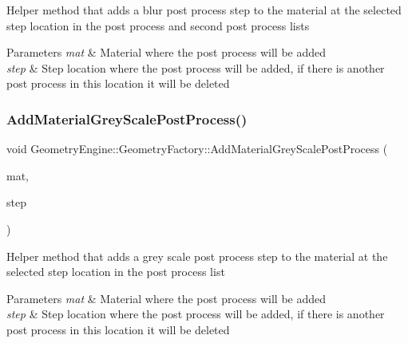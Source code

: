Helper method that adds a blur post process step to the material at the selected step location in the post process and second post process lists 
\begin{DoxyParams}{Parameters}
{\em mat} & Material where the post process will be added \\
\hline
{\em step} & Step location where the post process will be added, if there is another post process in this location it will be deleted \\
\hline
\end{DoxyParams}
\mbox{\label{class_geometry_engine_1_1_geometry_factory_a59a8934b2f66247a7edda001316cc7b1}} 
\subsubsection{\texorpdfstring{AddMaterialGreyScalePostProcess()}{AddMaterialGreyScalePostProcess()}}
{\footnotesize\ttfamily void Geometry\+Engine\+::\+Geometry\+Factory\+::\+Add\+Material\+Grey\+Scale\+Post\+Process (\begin{DoxyParamCaption}\item[{\mbox{\hyperlink{class_geometry_engine_1_1_geometry_material_1_1_material}{Geometry\+Material\+::\+Material}} $\ast$}]{mat,  }\item[{const \mbox{\hyperlink{namespace_geometry_engine_1_1_custom_shading_af8b09b91ca7086f4f67a5d4181f35e58}{Custom\+Shading\+::\+Material\+Post\+Process\+Steps}} \&}]{step }\end{DoxyParamCaption})\hspace{0.3cm}{\ttfamily [static]}}

Helper method that adds a grey scale post process step to the material at the selected step location in the post process list 
\begin{DoxyParams}{Parameters}
{\em mat} & Material where the post process will be added \\
\hline
{\em step} & Step location where the post process will be added, if there is another post process in this location it will be deleted \\
\hline
\end{DoxyParams}
\mbox{\label{class_geometry_engine_1_1_geometry_factory_a50fd72b5c91709daea566d8f233abb23}} 
